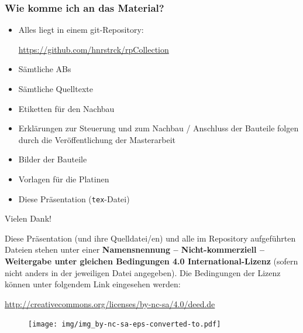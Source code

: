 \documentclass[usenames,dvipsnames]{beamer}
\begin{document}
\begin{frame}
\frametitle{Wie komme ich an das Material?}
\begin{itemize}
\item Alles liegt in einem git-Repository: 

\begin{mdframed}[linecolor=BlueViolet,linewidth=2px]
\begin{center}
\vspace{0.4cm}
\url{https://github.com/hnrstrck/rpCollection}
\vspace{0.4cm}
\end{center}
\end{mdframed}

\item Sämtliche ABs
\item Sämtliche Quelltexte
\item Etiketten für den Nachbau
\item Erklärungen zur Steuerung und zum Nachbau / Anschluss der Bauteile folgen durch die Veröffentlichung der Masterarbeit
\item Bilder der Bauteile
\item Vorlagen für die Platinen
\item Diese Präsentation (\texttt{tex}-Datei)
\end{itemize}
\end{frame}


\begin{frame}

\vspace{0.5cm}
{\Huge{\centerline{Vielen Dank!}}}

\begin{mdframed}[linecolor=Green,linewidth=1px]
\begin{center}
\vspace{0.2cm}
{\small Diese Präsentation (und ihre Quelldatei/en) und alle im Repository aufgeführten Dateien stehen unter einer \textbf{Namensnennung -- Nicht-kommerziell -- Weitergabe unter gleichen Bedingungen 4.0 International-Lizenz} (sofern nicht anders in der jeweiligen Datei angegeben). Die Bedingungen der Lizenz können unter folgendem Link eingesehen werden:

{\footnotesize \url{http://creativecommons.org/licenses/by-nc-sa/4.0/deed.de}}}

\begin{figure}[b]
	\centering
	\texttt{[image: img/img\_by-nc-sa-eps-converted-to.pdf]}
\end{figure}

\vspace{0.1cm}

\end{center}
\end{mdframed}

\end{frame}
\end{document}
